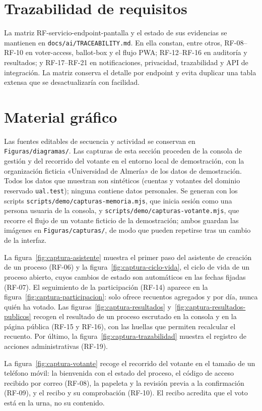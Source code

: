 \section{Trazabilidad de requisitos}
La matriz RF-servicio-endpoint-pantalla y el estado de sus evidencias se
mantienen en \texttt{docs/ai/TRACEABILITY.md}. En ella constan, entre otros,
RF-08--RF-10 en voter-access, ballot-box y el flujo PWA; RF-12--RF-16 en
auditoría y resultados; y RF-17--RF-21 en notificaciones, privacidad,
trazabilidad y API de integración. La matriz conserva el detalle por endpoint
y evita duplicar una tabla extensa que se desactualizaría con facilidad.

\section{Material gráfico}
\label{sec:material-grafico}
Las fuentes editables de secuencia y actividad se conservan en
\texttt{Figuras/diagramas/}. Las capturas de esta sección proceden de la
consola de gestión y del recorrido del votante en el entorno local de demostración, con la organización
ficticia «Universidad de Almería» de los datos de demostración. Todos los
datos que muestran son sintéticos (cuentas y votantes del dominio reservado
\texttt{ual.test}); ninguna contiene datos personales. Se generan con los
scripts \texttt{scripts/demo/capturas-memoria.mjs}, que inicia sesión como una
persona usuaria de la consola, y \texttt{scripts/demo/capturas-votante.mjs}, que
recorre el flujo de un votante ficticio de la demostración; ambos guardan las
imágenes en \texttt{Figuras/capturas/}, de modo que pueden repetirse tras un
cambio de la interfaz.

La figura~\ref{fig:captura-asistente} muestra el primer paso del asistente de
creación de un proceso (RF-06) y la figura~\ref{fig:captura-ciclo-vida}, el
ciclo de vida de un proceso abierto, cuyos cambios de estado son automáticos
en las fechas fijadas (RF-07). El seguimiento de la participación (RF-14)
aparece en la figura~\ref{fig:captura-participacion}: solo ofrece recuentos
agregados y por día, nunca quién ha votado. Las
figuras~\ref{fig:captura-resultados} y~\ref{fig:captura-resultados-publicos}
recogen el resultado de un proceso escrutado en la consola y en la página
pública (RF-15 y RF-16), con las huellas que permiten recalcular el recuento.
Por último, la figura~\ref{fig:captura-trazabilidad} muestra el registro de
acciones administrativas (RF-19).

La figura~\ref{fig:captura-votante} recoge el recorrido del votante en el
tamaño de un teléfono móvil: la bienvenida con el estado del proceso, el
código de acceso recibido por correo (RF-08), la papeleta y la revisión previa
a la confirmación (RF-09), y el recibo y su comprobación (RF-10). El recibo
acredita que el voto está en la urna, no su contenido.

